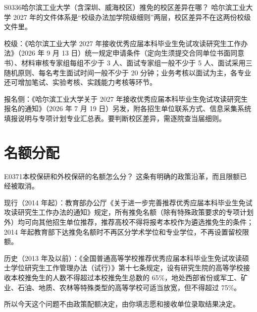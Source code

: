 \begin{qa}{S0336}{哈尔滨工业大学（含深圳、威海校区）推免的校区差异在哪？}
哈尔滨工业大学 2027 年的文件体系是“校级办法加学院级细则”两层，校区差异不在这两份校级文件里。

校级：《哈尔滨工业大学 2027 年接收优秀应届本科毕业生免试攻读研究生工作办法》（2026 年 9 月 13 日）统一规定申请条件（定向生须提交合同单位书面同意书）、材料审核专家组每组不少于 3 人、面试专家组一般不少于 5 人、面试采用三随机原则、每名考生面试时间一般不少于 20 分钟；业务考核以面试为主，各专业还可增加笔试、实验考核、实践能力考核等环节。

报名侧：《哈尔滨工业大学关于 2027 年接收优秀应届本科毕业生免试攻读研究生报名的通知》（2026 年 7 月 19 日）另发，附各招生单位联系方式、信息采集系统填报说明与专项计划专业汇总表。要判断校区差异，需逐院查当届细则。
\end{qa}

\section{名额分配}
\begin{qa}{E0371}{本校保研和外校保研的名额怎么分？}
这条有明确的政策沿革，而且限额已经被取消。

现行（2014 年起）：教育部办公厅《关于进一步完善推荐优秀应届本科毕业生免试攻读研究生工作办法的通知》规定，所有推免名额（除有特殊政策要求的专项计划外）均可向其他招生单位推荐，推荐高校不得将报考本校作为遴选推免生的条件；2014 年起教育部下达推免名额时不再区分学术学位和专业学位，不再设置留校限额。

历史（2013 年及以前）：《全国普通高等学校推荐优秀应届本科毕业生免试攻读硕士学位研究生工作管理办法（试行）》第十七条规定，设有研究生院的高等学校接收本校推免生的人数不得超过本校推免生总数的 65\%，地处西部省份或军工、矿业、石油、地质、农林等特殊类型的高等学校可适当放宽，但不得超过 75\%。

所以今天这个问题不由政策配额决定，由你填志愿和接收单位录取结果决定。
\end{qa}

